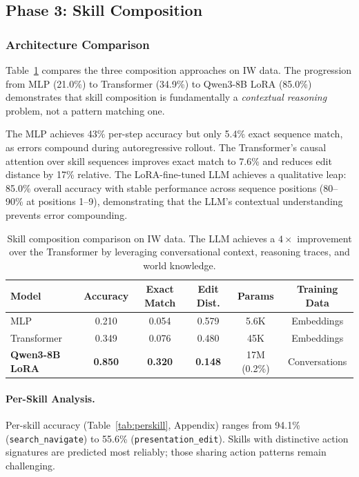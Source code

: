 \documentclass{article}
\begin{document}

\subsection{Phase 3: Skill Composition}
\label{sec:results_composition}

\subsubsection{Architecture Comparison}

Table~\ref{tab:composition} compares the three composition approaches on IW data. The progression from MLP (21.0\%) to Transformer (34.9\%) to Qwen3-8B LoRA (85.0\%) demonstrates that skill composition is fundamentally a \emph{contextual reasoning} problem, not a pattern matching one.

The MLP achieves 43\% per-step accuracy but only 5.4\% exact sequence match, as errors compound during autoregressive rollout. The Transformer's causal attention over skill sequences improves exact match to 7.6\% and reduces edit distance by 17\% relative. The LoRA-fine-tuned LLM achieves a qualitative leap: 85.0\% overall accuracy with stable performance across sequence positions (80--90\% at positions 1--9), demonstrating that the LLM's contextual understanding prevents error compounding.

\begin{table}[h]
\centering
\caption{Skill composition comparison on IW data. The LLM achieves a $4\times$ improvement over the Transformer by leveraging conversational context, reasoning traces, and world knowledge.}
\label{tab:composition}
\small
\begin{tabular}{lccccc}
\toprule
\textbf{Model} & \textbf{Accuracy} & \textbf{Exact Match} & \textbf{Edit Dist.} & \textbf{Params} & \textbf{Training Data} \\
\midrule
MLP & 0.210 & 0.054 & 0.579 & 5.6K & Embeddings \\
Transformer & 0.349 & 0.076 & 0.480 & 45K & Embeddings \\
\textbf{Qwen3-8B LoRA} & \textbf{0.850} & \textbf{0.320} & \textbf{0.148} & 17M (0.2\%) & Conversations \\
\bottomrule
\end{tabular}
\end{table}

\paragraph{Per-Skill Analysis.}
Per-skill accuracy (Table~\ref{tab:perskill}, Appendix) ranges from 94.1\% (\texttt{search\_navigate}) to 55.6\% (\texttt{presentation\_edit}). Skills with distinctive action signatures are predicted most reliably; those sharing action patterns remain challenging.
\end{document}
